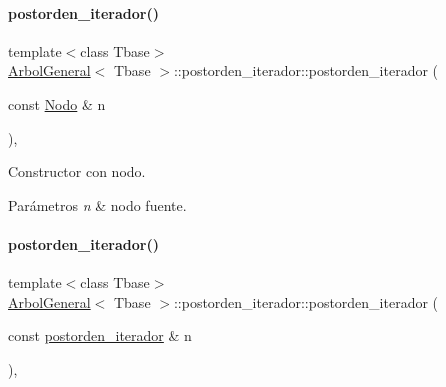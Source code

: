 \hypertarget{classArbolGeneral_1_1postorden__iterador_a40c1929529a5d1063e97c07a73ecb043}{}\label{classArbolGeneral_1_1postorden__iterador_a40c1929529a5d1063e97c07a73ecb043} 
\paragraph{\texorpdfstring{postorden\+\_\+iterador()}{postorden\_iterador()}\hspace{0.1cm}{\footnotesize\ttfamily [2/3]}}
{\footnotesize\ttfamily template$<$class Tbase$>$ \\
\hyperlink{classArbolGeneral}{Arbol\+General}$<$ Tbase $>$\+::postorden\+\_\+iterador\+::postorden\+\_\+iterador (\begin{DoxyParamCaption}\item[{const \hyperlink{classArbolGeneral_a12cc1b74a9095d89bc7334290d332f7a}{Nodo} \&}]{n }\end{DoxyParamCaption})\hspace{0.3cm}{\ttfamily [inline]}, {\ttfamily [private]}}



Constructor con nodo. 


\begin{DoxyParams}{Parámetros}
{\em n} & nodo fuente. \\
\hline
\end{DoxyParams}
\hypertarget{classArbolGeneral_1_1postorden__iterador_a07bc1d0276eb14be207144f0a69745d3}{}\label{classArbolGeneral_1_1postorden__iterador_a07bc1d0276eb14be207144f0a69745d3} 
\paragraph{\texorpdfstring{postorden\+\_\+iterador()}{postorden\_iterador()}\hspace{0.1cm}{\footnotesize\ttfamily [3/3]}}
{\footnotesize\ttfamily template$<$class Tbase$>$ \\
\hyperlink{classArbolGeneral}{Arbol\+General}$<$ Tbase $>$\+::postorden\+\_\+iterador\+::postorden\+\_\+iterador (\begin{DoxyParamCaption}\item[{const \hyperlink{classArbolGeneral_1_1postorden__iterador}{postorden\+\_\+iterador} \&}]{n }\end{DoxyParamCaption})\hspace{0.3cm}{\ttfamily [inline]}, {\ttfamily [private]}}



